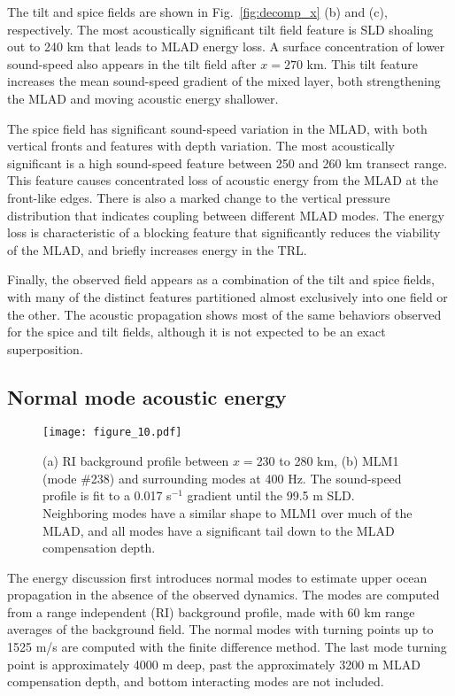 \documentclass[preprint,NumberedRefs]{JASA}
\begin{document}
The tilt and spice fields are shown in Fig.~\ref{fig:decomp_x} (b) and (c), respectively. The most acoustically significant tilt field feature is SLD shoaling out to 240 km that leads to MLAD energy loss. A surface concentration of lower sound-speed also appears in the tilt field after $x=270$ km. This tilt feature increases the mean sound-speed gradient of the mixed layer, both strengthening the MLAD and moving acoustic energy shallower.

The spice field has significant sound-speed variation in the MLAD, with both vertical fronts and features with depth variation. The most acoustically significant is a high sound-speed feature between 250 and 260 km transect range. This feature causes concentrated loss of acoustic energy from the MLAD at the front-like edges. There is also a marked change to the vertical pressure distribution that indicates coupling between different MLAD modes. The energy loss is characteristic of a blocking feature\cite{colosi2020observations} that significantly reduces the viability of the MLAD, and briefly increases energy in the TRL.

Finally, the observed field appears as a combination of the tilt and spice fields, with many of the distinct features partitioned almost exclusively into one field or the other. The acoustic propagation shows most of the same behaviors observed for the spice and tilt fields, although it is not expected to be an exact superposition.

\subsection{Normal mode acoustic energy}
\begin{figure}
\texttt{[image: figure\_10.pdf]}
    \caption{\label{fig:bg_modes}{(a) RI background profile between $x=$230 to 280 km, (b) MLM1 (mode \#238) and surrounding modes at 400 Hz. The sound-speed profile is fit to a 0.017 s$^{-1}$ gradient until the 99.5 m SLD. Neighboring modes have a similar shape to MLM1 over much of the MLAD, and all modes have a significant tail down to the MLAD compensation depth.}}
\end{figure}

The energy discussion first introduces normal modes to estimate upper ocean propagation in the absence of the observed dynamics. The modes are computed from a range independent (RI) background profile, made with 60 km range averages of the background field. The normal modes with turning points up to 1525 m/s are computed with the finite difference method.\cite{jensen2011computational} The last mode turning point is approximately 4000 m deep, past the approximately 3200 m MLAD compensation depth, and bottom interacting modes are not included.
\end{document}

